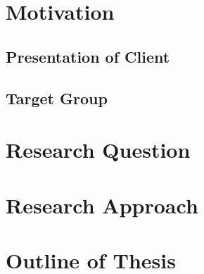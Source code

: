 \section{Motivation}
\subsection{Presentation of Client}
\subsection{Target Group}
\section{Research Question}
\section{Research Approach}
\section{Outline of Thesis}
